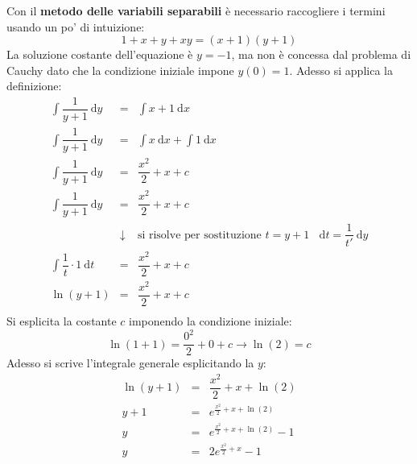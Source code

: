 \documentclass[a4paper]{article}
\begin{document}
	\noindent
	Con il \textbf{metodo delle variabili separabili} è necessario raccogliere i termini usando un po' di intuizione:
	\begin{equation*}
		1 + x + y + xy = \left(x+1\right) \left(y+1\right)
	\end{equation*}
	La soluzione costante dell'equazione è $y = -1$, ma non è concessa dal problema di Cauchy dato che la condizione iniziale impone $y\left(0\right) = 1$. Adesso si applica la definizione:
	\begin{equation*}
		\begin{array}{rcl}
			\displaystyle\int \dfrac{1}{y+1} \:\mathrm{d}y &=& \displaystyle\int x+1 \:\mathrm{d}x \\ [1em]
			\displaystyle\int \dfrac{1}{y+1} \:\mathrm{d}y &=& \displaystyle\int x \:\mathrm{d}x + \displaystyle\int 1 \:\mathrm{d}x \\ [1em]
			\displaystyle\int \dfrac{1}{y+1} \:\mathrm{d}y &=& \dfrac{x^{2}}{2} + x + c \\ [1em]
			\displaystyle\int \dfrac{1}{y+1} \:\mathrm{d}y &=& \dfrac{x^{2}}{2} + x + c \\ [1em]
			&\downarrow& \text{si risolve per sostituzione } t = y+1 \:\:\:\: \mathrm{d}t = \dfrac{1}{t'} \:\mathrm{d}y \\ [1em]
			\displaystyle\int \dfrac{1}{t} \cdot 1 \:\mathrm{d}t &=& \dfrac{x^{2}}{2} + x + c \\ [1em]
			\ln\left( y+1 \right) &=& \dfrac{x^{2}}{2} + x + c \\ [1em]
		\end{array}
	\end{equation*}
	Si esplicita la costante $c$ imponendo la condizione iniziale:
	\begin{equation*}
		\ln\left(1+1\right) = \dfrac{0^{2}}{2} + 0 + c \longrightarrow \ln\left(2\right) = c
	\end{equation*}
	Adesso si scrive l'integrale generale esplicitando la $y$:
	\begin{equation*}
		\begin{array}{rcl}
			\ln\left( y+1 \right) &=& \dfrac{x^{2}}{2} + x + \ln\left(2\right) \\
			y+1 &=& e^{\frac{x^{2}}{2} + x + \ln\left(2\right)} \\
			y &=& e^{\frac{x^{2}}{2} + x + \ln\left(2\right)} - 1 \\
			y &=& 2e^{\frac{x^{2}}{2} + x} - 1
		\end{array}
	\end{equation*}\newpage
\end{document}
